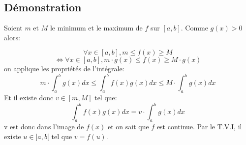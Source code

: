 \documentclass{article}
\begin{document}
\subsection{Démonstration}

Soient $ m $ et $ M $ le minimum et le maximum de $ f $ sur $ [a, b] $. Comme $ g(x) > 0 $ alors:

\[ \forall x \in [a, b], m \leq f(x) \geq M \]
\[ \Leftrightarrow \forall x \in [a, b], m \cdot g(x) \leq f(x) \geq M \cdot g(x) \]
on applique les propriétés de l'intégrale:
\[ m \cdot \int_{a}^b g(x)dx \leq \int_{a}^b f(x)g(x)dx \leq M \cdot \int_{a}^b g(x)dx \]
Et il existe donc $ v \in [m, M] $ tel que:
\[ \int_{a}^b f(x)g(x)dx = v \cdot \int_{a}^b g(x)dx \]
v est donc dans l'image de $ f(x) $ et on sait que $ f $ est continue. Par le T.V.I, il existe $ u \in ]a, b[ $ tel que $ v = f(u) $.
\end{document}
